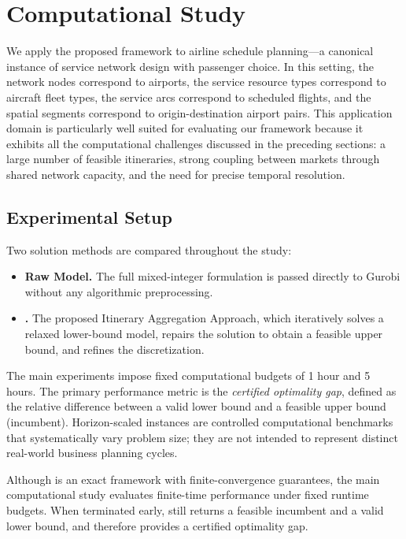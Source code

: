\newcommand{\textCase}[1]{\text{#1}}
\chapter{Computational Study}
\label{sec:comp_study}

We apply the proposed \algoNotation framework to airline schedule planning---a canonical instance of service network design with passenger choice. In this setting, the network nodes correspond to airports, the service resource types correspond to aircraft fleet types, the service arcs correspond to scheduled flights, and the spatial segments correspond to origin-destination airport pairs. This application domain is particularly well suited for evaluating our framework because it exhibits all the computational challenges discussed in the preceding sections: a large number of feasible itineraries, strong coupling between markets through shared network capacity, and the need for precise temporal resolution.

\section{Experimental Setup}
\label{sec:exp_setup}

Two solution methods are compared throughout the study:
\begin{itemize}
    \item \textbf{Raw Model.} The full mixed-integer formulation is passed directly to Gurobi without any algorithmic preprocessing.
    \item \textbf{\algoNotation.} The proposed Itinerary Aggregation Approach, which iteratively solves a relaxed lower-bound model, repairs the solution to obtain a feasible upper bound, and refines the discretization.
\end{itemize}

The main experiments impose fixed computational budgets of 1 hour and 5 hours. The primary performance metric is the \emph{certified optimality gap}, defined as the relative difference between a valid lower bound and a feasible upper bound (incumbent). Horizon-scaled instances are controlled computational benchmarks that systematically vary problem size; they are not intended to represent distinct real-world business planning cycles.

Although \algoNotation is an exact framework with finite-convergence guarantees, the main computational study evaluates finite-time performance under fixed runtime budgets. When terminated early, \algoNotation still returns a feasible incumbent and a valid lower bound, and therefore provides a certified optimality gap.

